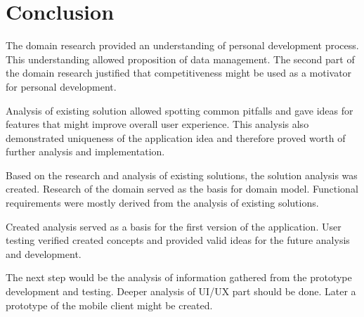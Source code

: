 
\chapter{Conclusion}\label{ch:conclusion}

The domain research provided an understanding of personal development process.
This understanding allowed proposition of data management.
The second part of the domain research justified that competitiveness might be used as a motivator for personal development.

Analysis of existing solution allowed spotting common pitfalls and gave ideas for features that might improve overall user experience.
This analysis also demonstrated uniqueness of the application idea and therefore proved worth of further analysis and implementation.

Based on the research and analysis of existing solutions, the solution analysis was created.
Research of the domain served as the basis for domain model.
Functional requirements were mostly derived from the analysis of existing solutions.

Created analysis served as a basis for the first version of the application.
User testing verified created concepts and provided valid ideas for the future analysis and development.

The next step would be the analysis of information gathered from the prototype development and testing.
Deeper analysis of UI/UX part should be done.
Later a prototype of the mobile client might be created.